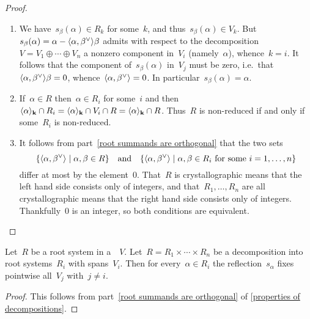 \begin{proof}
  \leavevmode
  \begin{enumerate}
    \item
      We have~$s_\beta(\alpha) \in R_k$ for some~$k$, and thus~$s_\beta(\alpha) \in V_k$.
      But~$s_\beta(\alpha) = \alpha - \pair{\alpha, \check{\beta}} \beta$ admits with respect to the decomposition~$V = V_1 \oplus \dotsb \oplus V_n$ a nonzero component in~$V_i$ (namely~$\alpha$), whence~$k = i$.
      It follows that the component of~$s_\beta(\alpha)$ in~$V_j$ must be zero, i.e.\ that~$\pair{\alpha, \check{\beta}} \beta = 0$, whence~$\pair{\alpha, \check{\beta}} = 0$.
      In particular~$s_\beta(\alpha) = \alpha$.
    \item
      If~$\alpha \in R$ then~$\alpha \in R_i$ for some~$i$ and then~$\langle\alpha\rangle_{\mathbf{k}} \cap R_i = \langle\alpha\rangle_{\mathbf{k}} \cap V_i \cap R = \langle\alpha\rangle_{\mathbf{k}} \cap R$.
      Thus~$R$ is non-reduced if and only if some~$R_i$ is non-reduced.
    \item
      It follows from part~\ref*{root summands are orthogonal} that the two sets
      \[
        \{
          \pair{\alpha, \check{\beta}}
        \suchthat
          \alpha, \beta \in R
        \}
        \quad\text{and}\quad
        \{
          \pair{\alpha, \check{\beta}}
        \suchthat
          \text{$\alpha, \beta \in R_i$ for some~$i = 1, \dotsc, n$}
        \}
      \]
      differ at most by the element~$0$.
      That~$R$ is crystallographic means that the left hand side consists only of integers, and that~$R_1, \dotsc, R_n$ are all crystallographic means that the right hand side consists only of integers.
      Thankfully~$0$ is an integer, so both conditions are equivalent.
    \qedhere
  \end{enumerate}
\end{proof}


\begin{corollary}
  \label{reflection fixes other summands}
  Let~$R$ be a root system in a~{\vectorspace{$\kf$}}~$V$.
  Let~$R = R_1 \times \dotsb \times R_n$ be a decomposition into root systems~$R_i$ with spans~$V_i$.
  Then for every~$\alpha \in R_i$ the reflection~$s_\alpha$ fixes pointwise all~$V_j$ with~$j \neq i$.
\end{corollary}


\begin{proof}
  This follows from part~\ref*{root summands are orthogonal} of \cref{properties of decompositions}.
\end{proof}


